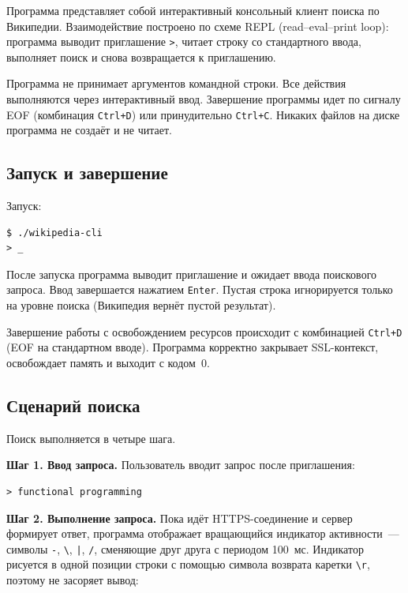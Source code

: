 \documentclass[12pt]{extarticle}
\renewcommand{\baselinestretch}{1.5}
\begin{document}
Программа представляет собой интерактивный консольный клиент
поиска по Википедии. Взаимодействие построено по схеме REPL
(read--eval--print loop): программа выводит приглашение \texttt{>},
читает строку со стандартного ввода, выполняет поиск и снова
возвращается к приглашению.

Программа не принимает аргументов командной строки. Все действия
выполняются через интерактивный ввод. Завершение программы идет по сигналу
EOF (комбинация \texttt{Ctrl+D}) или принудительно \texttt{Ctrl+C}.
Никаких файлов на диске программа не создаёт и не читает.

\subsection{Запуск и завершение}

Запуск:

\renewcommand{\baselinestretch}{1}
\begin{lstlisting}
$ ./wikipedia-cli
> _
\end{lstlisting}
\renewcommand{\baselinestretch}{1.5}

После запуска программа выводит приглашение и ожидает ввода
поискового запроса. Ввод завершается нажатием \texttt{Enter}.
Пустая строка игнорируется только на уровне поиска (Википедия
вернёт пустой результат).

Завершение работы с освобождением ресурсов происходит с комбинацией \texttt{Ctrl+D} (EOF на
стандартном вводе). Программа корректно закрывает SSL-контекст,
освобождает память и выходит с кодом~0.

\subsection{Сценарий поиска}

Поиск выполняется в четыре шага.

\textbf{Шаг 1. Ввод запроса.} Пользователь вводит запрос после
приглашения:

\renewcommand{\baselinestretch}{1}
\begin{lstlisting}
> functional programming
\end{lstlisting}
\renewcommand{\baselinestretch}{1.5}

\textbf{Шаг 2. Выполнение запроса.} Пока идёт HTTPS-соединение и
сервер формирует ответ, программа отображает вращающийся индикатор
активности~--- символы \texttt{-}, \texttt{\textbackslash},
\texttt{|}, \texttt{/}, сменяющие друг друга с периодом
100~мс. Индикатор рисуется в одной позиции строки с помощью
символа возврата каретки \texttt{\textbackslash r}, поэтому не
засоряет вывод:
\end{document}
